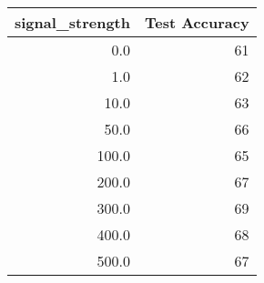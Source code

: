 \begin{tabular}{rr}
\toprule
 signal\_strength &  Test Accuracy \\
\midrule
             0.0 &             61 \\
             1.0 &             62 \\
            10.0 &             63 \\
            50.0 &             66 \\
           100.0 &             65 \\
           200.0 &             67 \\
           300.0 &             69 \\
           400.0 &             68 \\
           500.0 &             67 \\
\bottomrule
\end{tabular}
